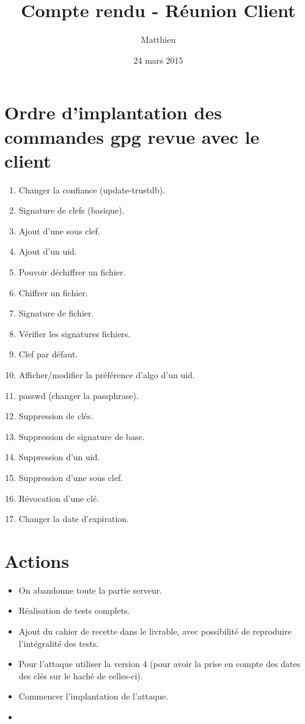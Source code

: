 \documentclass{CR-projet}
\title{Compte rendu - Réunion Client}
\author{Matthieu \bsc{FIN}}
\date{24 mars 2015}
\begin{document}
\maketitle
\newpage

\newpage

\section{Ordre d'implantation des commandes gpg revue avec le client}

\begin{enumerate}
	\item Changer la confiance (update-trustdb).
	\item Signature de clefs (basique).
	\item Ajout d'une sous clef.
	\item Ajout d'un uid.
	\item Pouvoir déchiffrer un fichier.
	\item Chiffrer un fichier.
	\item Signature de fichier.
	\item Vérifier les signatures fichiers.
	\item Clef par défaut.
	\item Afficher/modifier la préférence d'algo d'un uid.
	\item passwd (changer la passphrase).
	\item Suppression de clés.
	\item Suppression de signature de base.
	\item Suppression d'un uid.
	\item Suppression d'une sous clef.
	\item Révocation d'une clé. 
	\item Changer la date d'expiration.
\end{enumerate}

\section{Actions}

\begin{itemize}
	\item On abandonne toute la partie serveur.
	\item Réalisation de tests complets.
	\item Ajout du cahier de recette dans le livrable, avec possibilité de reproduire l'intégralité des tests.
	\item Pour l'attaque utiliser la version 4 (pour avoir la prise en compte des dates des clés sur le haché de celles-ci).
	\item Commencer l'implantation de l'attaque.
	\item 
\end{itemize}
\end{document}
